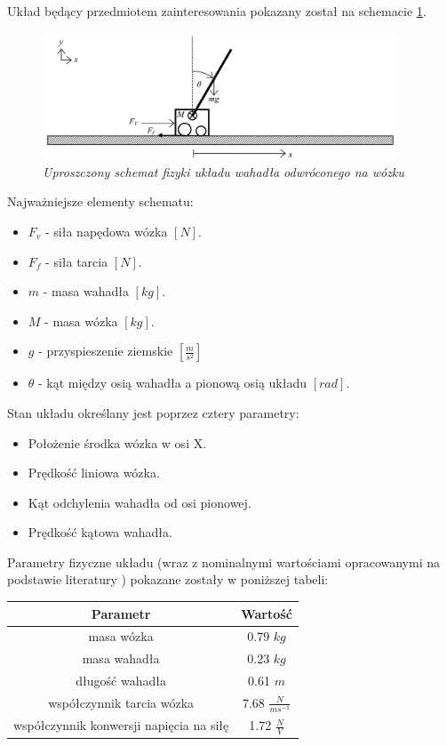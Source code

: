 \documentclass[12pt, oneside]{report}
\theoremstyle{definition}
\begin{document}
Układ będący przedmiotem zainteresowania pokazany został na schemacie \ref{SytemSchemeImage}.

\begin{figure}[H]
	\centering
		\includegraphics[width = 300pt]{SystemScheme} 
		\caption{\textit{Uproszczony schemat fizyki układu wahadła odwróconego na wózku \cite{LMIP} }}
		\label{SytemSchemeImage}
\end{figure}

Najważniejsze elementy schematu:
\begin{itemize}
\item \(F_v\) - siła napędowa wózka \([N]\).
\item \(F_f\) - siła tarcia \([N]\).
\item \(m\) - masa wahadła \([kg]\). 
\item \(M\) - masa wózka \([kg]\).
\item \(g\) - przyspieszenie ziemskie \([\frac{m}{s^2}]\) 
\item \(\theta\) - kąt między osią wahadła a pionową osią układu \([rad]\).
\end{itemize}

Stan układu określany jest poprzez cztery parametry:
\begin{itemize}
\item Położenie środka wózka w osi X.
\item Prędkość liniowa wózka.
\item Kąt odchylenia wahadła od osi pionowej.
\item Prędkość kątowa wahadła.
\end{itemize}

Parametry fizyczne układu (wraz z nominalnymi wartościami opracowanymi na podstawie literatury \cite{LMIP}) pokazane zostały w poniższej tabeli:
\begin{center}
\begin{tabular}{|c|c|}
  \hline 
  Parametr & Wartość\\
  \hline
  masa wózka & 0.79 \(kg\) \\
  \hline
  masa wahadła & 0.23 \(kg\) \\
  \hline
  długość wahadła & 0.61 \(m\) \\
  \hline
  współczynnik tarcia wózka & 7.68 \(\frac{N}{ms^{-1}}\) \\
  \hline
  współczynnik konwersji napięcia na siłę & 1.72 \(\frac{N}{V}\) \\
  \hline
\end{tabular} 
\end{center}
\end{document}
